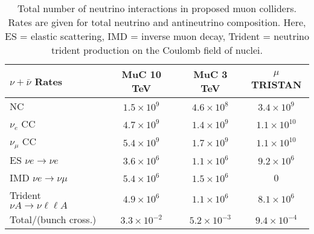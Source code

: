 
\begin{table}[t]
  \centering
  \renewcommand{\arraystretch}{1.25}
  \begin{ruledtabular}
  \begin{tabular}{lccc}
     $\nu+\bar\nu$ Rates 
     & MuC 10 TeV & MuC 3 TeV & $\mu$TRISTAN 
    \\
    \hline
    NC
    & $1.5\times 10^{9}$ & $4.6\times 10^{8}$ & $3.4\times 10^{9}$ 
    \\
    $\nu_e$ CC
    & $4.7\times 10^{9}$ & $1.4\times 10^{9}$ & $1.1\times 10^{10}$ 
    \\
    $\nu_\mu$ CC
    & $5.4\times 10^{9}$ & $1.7\times 10^{9}$ & $1.1\times 10^{10}$ 
    \\
    ES $\nu e \to \nu e$
    & $3.6\times 10^{6}$ & $1.1\times 10^{6}$ & $9.2\times 10^{6}$     
    \\
    IMD $\nu e \to \nu \mu$
    & $5.4\times 10^{6}$ & $1.5\times 10^{6}$ & 0 
    \\
    Trident $\nu A \to \nu \ell \ell A$
    & $4.9\times 10^{6}$ & $1.1\times 10^{6}$ & $8.1\times 10^{6}$ 
    \\ \hline
    Total/(bunch cross.)
    & $3.3\times 10^{-2}$& $5.2\times 10^{-3}$& $9.4\times 10^{-4}$
    \\
\end{tabular}
  \end{ruledtabular}
  \caption{Total number of neutrino interactions in proposed muon colliders.
  Rates are given for total neutrino and antineutrino composition. Here, ES = elastic scattering, IMD = inverse muon decay, Trident = neutrino trident production on the Coulomb field of nuclei.}
  \label{tab:event_rate_makeup}
\end{table}


